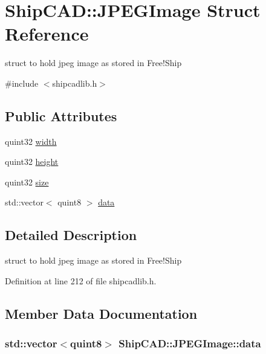 \hypertarget{structShipCAD_1_1JPEGImage}{}\section{Ship\+C\+AD\+:\+:J\+P\+E\+G\+Image Struct Reference}
\label{structShipCAD_1_1JPEGImage}


struct to hold jpeg image as stored in Free!\+Ship  




{\ttfamily \#include $<$shipcadlib.\+h$>$}

\subsection*{Public Attributes}
\begin{DoxyCompactItemize}
\item 
quint32 \hyperlink{structShipCAD_1_1JPEGImage_aef2620e748540276be24c0275620870b}{width}
\item 
quint32 \hyperlink{structShipCAD_1_1JPEGImage_a35650ffa91785a63ba6f31cd87e208a2}{height}
\item 
quint32 \hyperlink{structShipCAD_1_1JPEGImage_a7e28010a6fb1d0c2926f8381b2e29931}{size}
\item 
std\+::vector$<$ quint8 $>$ \hyperlink{structShipCAD_1_1JPEGImage_aa1ec94e32147a6e39de7809b45604e21}{data}
\end{DoxyCompactItemize}


\subsection{Detailed Description}
struct to hold jpeg image as stored in Free!\+Ship 

Definition at line 212 of file shipcadlib.\+h.



\subsection{Member Data Documentation}
\subsubsection[{\texorpdfstring{data}{data}}]{\setlength{\rightskip}{0pt plus 5cm}std\+::vector$<$quint8$>$ Ship\+C\+A\+D\+::\+J\+P\+E\+G\+Image\+::data}\hypertarget{structShipCAD_1_1JPEGImage_aa1ec94e32147a6e39de7809b45604e21}{}\label{structShipCAD_1_1JPEGImage_aa1ec94e32147a6e39de7809b45604e21}


